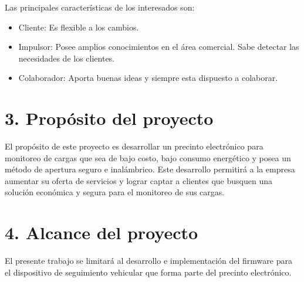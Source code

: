 \documentclass[
11pt, %
]{charter}
\begin{document}
%
%
%
% 
Las principales características de los interesados son:
\begin{itemize}
	\item Cliente: Es flexible a los cambios.
	\item Impulsor: Posee amplios conocimientos en el área comercial. Sabe detectar las necesidades de los clientes.
	\item Colaborador: Aporta buenas ideas y siempre esta dispuesto a colaborar.
\end{itemize}
%



\section{3. Propósito del proyecto}
\label{sec:proposito}

El propósito de este proyecto es desarrollar un precinto electrónico para monitoreo de cargas que sea de bajo costo, bajo consumo energético y posea un método de apertura seguro e inalámbrico. Este desarrollo permitirá a la empresa \empclientename \,aumentar su oferta de servicios y lograr captar a clientes que busquen una solución económica y segura para el monitoreo de sus cargas.  

%

\section{4. Alcance del proyecto}
\label{sec:alcance}
%
%
%
%
El presente trabajo se limitará al desarrollo e implementación del firmware para el dispositivo de seguimiento vehicular que forma parte del precinto electrónico.
\end{document}
